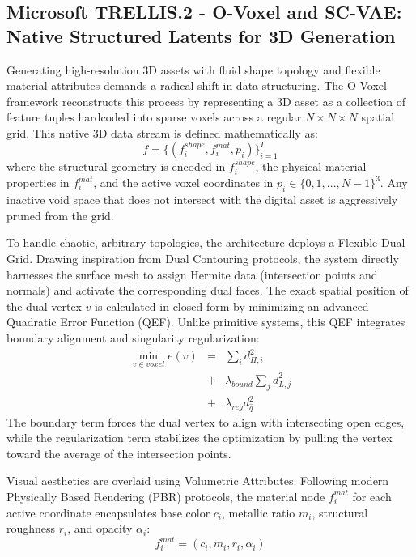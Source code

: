 \subsection{Microsoft TRELLIS.2 - O-Voxel and SC-VAE: Native Structured Latents for 3D Generation}


Generating high-resolution 3D assets with fluid shape topology and flexible material attributes demands a radical shift in data structuring. The O-Voxel framework \cite{xiang2025native} reconstructs this process by representing a 3D asset as a collection of feature tuples hardcoded into sparse voxels across a regular $N \times N \times N$ spatial grid. This native 3D data stream is defined mathematically as:
\begin{equation}
f =\{(f^{shape}_i, f^{mat}_i, p_i)\}_{i=1}^L
\end{equation}
where the structural geometry is encoded in $f^{shape}_i$, the physical material properties in $f^{mat}_i$, and the active voxel coordinates in $p_i \in \{0,1,...,N - 1\}^3$. Any inactive void space that does not intersect with the digital asset is aggressively pruned from the grid.

To handle chaotic, arbitrary topologies, the architecture deploys a Flexible Dual Grid. Drawing inspiration from Dual Contouring protocols, the system directly harnesses the surface mesh to assign Hermite data (intersection points and normals) and activate the corresponding dual faces. The exact spatial position of the dual vertex $v$ is calculated in closed form by minimizing an advanced Quadratic Error Function (QEF). Unlike primitive systems, this QEF integrates boundary alignment and singularity regularization:
\begin{equation}
\begin{array}{rcl}
\min_{v\in voxel} e(v) & = & \sum_i d^2_{\Pi,i} \\
                       & + & \lambda_{bound} \sum_j d^2_{L,j} \\
                       & + & \lambda_{reg} d^2_{\hat{q}}
\end{array}
\end{equation}
The boundary term forces the dual vertex to align with intersecting open edges, while the regularization term stabilizes the optimization by pulling the vertex toward the average of the intersection points.

Visual aesthetics are overlaid using Volumetric Attributes. Following modern Physically Based Rendering (PBR) protocols, the material node $f^{mat}_i$ for each active coordinate encapsulates base color $c_i$, metallic ratio $m_i$, structural roughness $r_i$, and opacity $\alpha_i$:
\begin{equation}
f^{mat}_i = (c_i, m_i, r_i, \alpha_i)
\end{equation}


